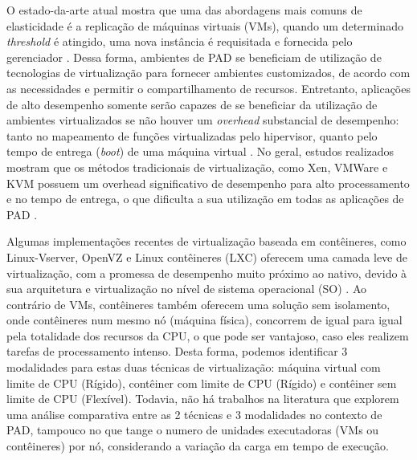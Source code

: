 \documentclass[twoside,english,brazilian]{UNISINOSartigo}
\begin{document}
O estado-da-arte atual mostra que uma das abordagens mais comuns de elasticidade é a replicação de máquinas virtuais (VMs), quando um determinado \textit{threshold} é atingido, uma nova instância é requisitada e fornecida pelo gerenciador \cite{7090978,7185168,6217477}. Dessa forma, ambientes de PAD se beneficiam de utilização de tecnologias de virtualização para fornecer ambientes customizados, de acordo com as necessidades e permitir o compartilhamento de recursos. Entretanto, aplicações de alto desempenho somente serão capazes de se beneficiar da utilização de ambientes virtualizados se não houver um \textit{overhead} substancial de desempenho: tanto no mapeamento de funções virtualizadas pelo hipervisor, quanto pelo tempo de entrega (\textit{boot}) de uma máquina virtual \cite{Xavier2013}. No geral, estudos realizados mostram que os métodos tradicionais de virtualização, como Xen, VMWare e KVM possuem um overhead significativo de desempenho para alto processamento e no tempo de entrega, o que dificulta a sua utilização em todas as aplicações de PAD \cite{Zheng2017}. 

Algumas implementações recentes de virtualização baseada em contêineres, como Linux-Vserver, OpenVZ e Linux contêineres (LXC) oferecem uma camada leve de virtualização, com a promessa de desempenho muito próximo ao nativo, devido à sua arquitetura e virtualização no nível de sistema operacional (SO) \cite{Bernstein2014}. Ao contrário de VMs, contêineres também oferecem uma solução sem isolamento, onde contêineres num mesmo nó (máquina física), concorrem de igual para igual pela totalidade dos recursos da CPU, o que pode ser vantajoso, caso eles realizem tarefas de processamento intenso. Desta forma, podemos identificar 3 modalidades para estas duas técnicas de virtualização: máquina virtual com limite de CPU (Rígido), contêiner com limite de CPU (Rígido) e contêiner sem limite de CPU (Flexível). Todavia, não há trabalhos na literatura que explorem uma análise comparativa entre as 2 técnicas e 3 modalidades no contexto de PAD, tampouco no que tange o numero de unidades executadoras (VMs ou contêineres) por nó, considerando a variação da carga em tempo de execução.
\end{document}
